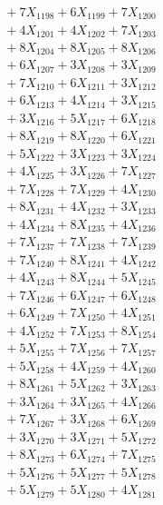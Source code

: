 \documentclass[a4paper,10pt]{article}
\begin{document}
{\begin{align}
&\;  + 7 X_{1198} + 6 X_{1199} + 7 X_{1200} \\[0.3ex]
&\;  + 4 X_{1201} + 4 X_{1202} + 7 X_{1203} \\[0.3ex]
&\;  + 8 X_{1204} + 8 X_{1205} + 8 X_{1206} \\[0.3ex]
&\;  + 6 X_{1207} + 3 X_{1208} + 3 X_{1209} \\[0.5ex]\allowbreak
&\;  + 7 X_{1210} + 6 X_{1211} + 3 X_{1212} \\[0.3ex]
&\;  + 6 X_{1213} + 4 X_{1214} + 3 X_{1215} \\[0.3ex]
&\;  + 3 X_{1216} + 5 X_{1217} + 6 X_{1218} \\[0.3ex]
&\;  + 8 X_{1219} + 8 X_{1220} + 6 X_{1221} \\[0.3ex]
&\;  + 5 X_{1222} + 3 X_{1223} + 3 X_{1224} \\[0.3ex]
&\;  + 4 X_{1225} + 3 X_{1226} + 7 X_{1227} \\[0.3ex]
&\;  + 7 X_{1228} + 7 X_{1229} + 4 X_{1230} \\[0.3ex]
&\;  + 8 X_{1231} + 4 X_{1232} + 3 X_{1233} \\[0.3ex]
&\;  + 4 X_{1234} + 8 X_{1235} + 4 X_{1236} \\[0.3ex]
&\;  + 7 X_{1237} + 7 X_{1238} + 7 X_{1239} \\[0.5ex]\allowbreak
&\;  + 7 X_{1240} + 8 X_{1241} + 4 X_{1242} \\[0.3ex]
&\;  + 4 X_{1243} + 8 X_{1244} + 5 X_{1245} \\[0.3ex]
&\;  + 7 X_{1246} + 6 X_{1247} + 6 X_{1248} \\[0.3ex]
&\;  + 6 X_{1249} + 7 X_{1250} + 4 X_{1251} \\[0.3ex]
&\;  + 4 X_{1252} + 7 X_{1253} + 8 X_{1254} \\[0.3ex]
&\;  + 5 X_{1255} + 7 X_{1256} + 7 X_{1257} \\[0.3ex]
&\;  + 5 X_{1258} + 4 X_{1259} + 4 X_{1260} \\[0.3ex]
&\;  + 8 X_{1261} + 5 X_{1262} + 3 X_{1263} \\[0.3ex]
&\;  + 3 X_{1264} + 3 X_{1265} + 4 X_{1266} \\[0.3ex]
&\;  + 7 X_{1267} + 3 X_{1268} + 6 X_{1269} \\[0.5ex]\allowbreak
&\;  + 3 X_{1270} + 3 X_{1271} + 5 X_{1272} \\[0.3ex]
&\;  + 8 X_{1273} + 6 X_{1274} + 7 X_{1275} \\[0.3ex]
&\;  + 5 X_{1276} + 5 X_{1277} + 5 X_{1278} \\[0.3ex]
&\;  + 5 X_{1279} + 5 X_{1280} + 4 X_{1281} \\[0.3ex]

\end{align}}
\end{document}
